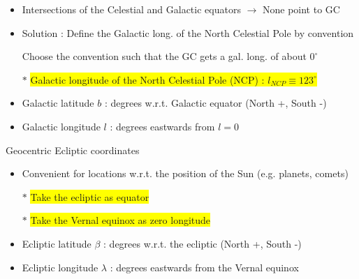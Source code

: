 \Tr
\begin{itemize}
\item Intersections of the Celestial and Galactic equators $\rightarrow$ None point to GC
\item Solution : {\blue Define the Galactic long. of the North Celestial Pole by convention}
\item[] Choose the convention such that the GC gets a gal. long. of about $0^{\circ}$ 
\item[$\ast$] \colorbox{yellow}{Galactic longitude of the North Celestial Pole (NCP) : $l_{NCP} \equiv 123^{\circ}$}
\item {\blue Galactic latitude $b$} : degrees w.r.t. Galactic equator (North +, South -)
\item {\blue Galactic longitude $l$} : degrees eastwards from $l=0$
\end{itemize}
%
\begin{center}
{\red Geocentric Ecliptic coordinates}
\end{center}
%
\begin{itemize}
\item Convenient for locations w.r.t. the position of the Sun (e.g. planets, comets)
\item[$\ast$] \colorbox{yellow}{Take the ecliptic as equator}
\item[$\ast$] \colorbox{yellow}{Take the Vernal equinox as zero longitude}
\item {\blue Ecliptic latitude $\beta$} : degrees w.r.t. the ecliptic (North +, South -)
\item {\blue Ecliptic longitude $\lambda$} : degrees eastwards from the Vernal equinox
\end{itemize}

